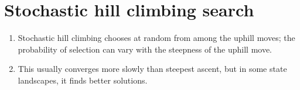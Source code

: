 \section{Stochastic hill climbing search \cite{ai/book/Artificial-Intelligence-A-Modern-Approach/Russell-Norvig}}
\label{AI: Algorithms/Stochastic hill climbing search}



\begin{enumerate}
    \item Stochastic hill climbing chooses at random from among the uphill moves; the probability of selection can vary with the steepness of the uphill move. 
    \hfill \cite{ai/book/Artificial-Intelligence-A-Modern-Approach/Russell-Norvig}
    
    \item This usually converges more slowly than steepest ascent, but in some state landscapes, it finds better solutions.
    \hfill \cite{ai/book/Artificial-Intelligence-A-Modern-Approach/Russell-Norvig}
\end{enumerate}


















